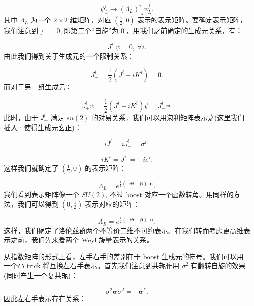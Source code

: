 \documentclass[10pt,UTF8]{ctexart}
\begin{document}
\begin{equation}
\psi_{L}^{i}\rightarrow{\left(\Lambda_{L}\right)^{i}}_{j}\psi_{L}^{j}.
\end{equation}
其中 $\Lambda_{L}$ 为一个 $2\times2$ 维矩阵，对应 $\left(\frac{1}{2},0\right)$
表示的表示矩阵。要确定表示矩阵，我们注意到 $j_{-}=0$, 即第二个“自旋”为 0 ，用我们之前确定的生成元关系，有：

\begin{equation}
J_{-}^{i}\psi=0,\ \forall i.
\end{equation}
由此我们得到关于生成元的一个限制关系：

\begin{equation}
J_{-}^{i}=\frac{1}{2}\left(J^{i}-iK^{i}\right)=0.
\end{equation}
而对于另一组生成元：

\begin{equation}
J_{+}^{i}\psi=\frac{1}{2}\left(J^{i}+iK^{i}\right)\psi=J_{-}^{i}\psi.
\end{equation}
此时，由于 $J_{-}^{i}$ 满足 $su(2)$ 的对易关系，我们可以用泡利矩阵表示之(这里我们插入 i 使得生成元幺正)：

\begin{equation}
iJ^{i}=iJ_{-}^{i}=\sigma^{i};
\end{equation}

\begin{equation}
iK^{i}=J_{-}^{i}=-i\sigma^{i}.
\end{equation}
这样我们就确定了 $\left(\frac{1}{2},0\right)$ 的表示矩阵：

\begin{equation}
\Lambda_{L}=e^{\frac{1}{2}\left(-i\bm{\theta}-\bm{\beta}\right)\cdot\bm{\sigma}}.
\end{equation}
我们看到表示矩阵像一个 $SU(2)$, 不过 boost 对应一个虚数转角。用同样的方法，我们可以得到 $\left(0,\frac{1}{2}\right)$
表示对应的矩阵：

\begin{equation}
\Lambda_{R}=e^{\frac{1}{2}\left(-i\bm{\theta}+\bm{\beta}\right)\cdot\bm{\sigma}}.
\end{equation}
这样，我们确定了洛伦兹群两个不等价二维不可约表示。在我们转而考虑更高维表示之前，我们先来看两个 Weyl 旋量表示的关系。

从指数矩阵的形式上看，左手右手的差别在于 boost 生成元的符号。我们可以用一个小 trick 将互换左右手表示。首先我们注意到共轭作用
$\sigma^{2}$ 有翻转自旋的效果(同时产生一个复共轭)：

\begin{equation}
\sigma^{2}\bm{\sigma}\sigma^{2}=-\bm{\sigma}^{*}.
\end{equation}
因此左右手表示存在关系：
\end{document}
